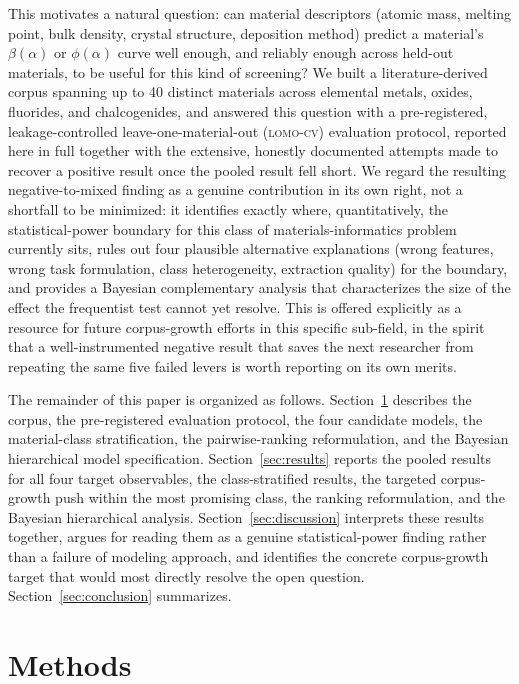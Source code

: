 \documentclass[aip,amsmath,amssymb,reprint]{revtex4-1}
\newcommand{\lomo}{\textsc{lomo-cv}}
\begin{document}
This motivates a natural question: can material descriptors
(atomic mass, melting point, bulk density, crystal structure,
deposition method) predict a material's $\beta(\alpha)$ or
$\phi(\alpha)$ curve well enough, and reliably enough across held-out
materials, to be useful for this kind of screening? We built a
literature-derived corpus spanning up to 40 distinct materials across
elemental metals, oxides, fluorides, and chalcogenides, and answered
this question with a pre-registered, leakage-controlled
leave-one-material-out (\lomo{}) evaluation protocol, reported here in
full together with the extensive, honestly documented attempts made to
recover a positive result once the pooled result fell short. We regard
the resulting negative-to-mixed finding as a genuine contribution in
its own right, not a shortfall to be minimized: it identifies exactly
where, quantitatively, the statistical-power boundary for this class
of materials-informatics problem currently sits, rules out four
plausible alternative explanations (wrong features, wrong task
formulation, class heterogeneity, extraction quality) for the
boundary, and provides a Bayesian complementary analysis that
characterizes the size of the effect the frequentist test cannot yet
resolve. This is offered explicitly as a resource for future
corpus-growth efforts in this specific sub-field, in the spirit that a
well-instrumented negative result that saves the next researcher from
repeating the same five failed levers is worth reporting on its own
merits.

The remainder of this paper is organized as follows.
Section~\ref{sec:methods} describes the corpus, the pre-registered
evaluation protocol, the four candidate models, the material-class
stratification, the pairwise-ranking reformulation, and the Bayesian
hierarchical model specification. Section~\ref{sec:results} reports
the pooled results for all four target observables, the
class-stratified results, the targeted corpus-growth push within the
most promising class, the ranking reformulation, and the Bayesian
hierarchical analysis. Section~\ref{sec:discussion} interprets these
results together, argues for reading them as a genuine
statistical-power finding rather than a failure of modeling
approach, and identifies the concrete corpus-growth target that would
most directly resolve the open question. Section~\ref{sec:conclusion}
summarizes.

\section{Methods}
\label{sec:methods}
\end{document}
